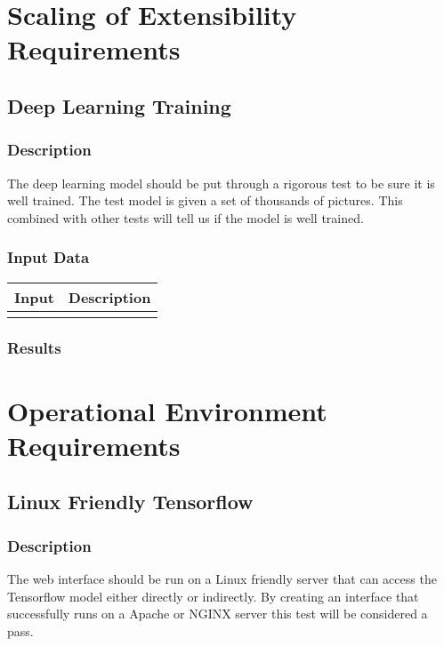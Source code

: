 \documentclass{scrreprt}
\begin{document}
\section{Scaling of Extensibility Requirements}
\subsection{Deep Learning Training}
\subsubsection{Description}
\begin{flushleft}
The deep learning model should be put through a rigorous test to be sure it is well trained. The test model is given a set of thousands of pictures. This combined with other tests will tell us if the model is well trained.
\end{flushleft}
\subsubsection{Input Data}
 \centering
 \begin{tabular}{p{3cm}p{6cm}}
 \hline\hline
 Input & Description\\
 \hline\hline
   &  \\ %
 \hline
 \end{tabular}
\subsubsection{Results}

\section{Operational Environment Requirements}

\subsection{Linux Friendly Tensorflow}
\subsubsection{Description}
\begin{flushleft}
The web interface should be run on a Linux friendly server that can access the Tensorflow model either directly or indirectly. By creating an interface that successfully runs on a Apache or NGINX server this test will be considered a pass.
\end{flushleft}
\end{document}
